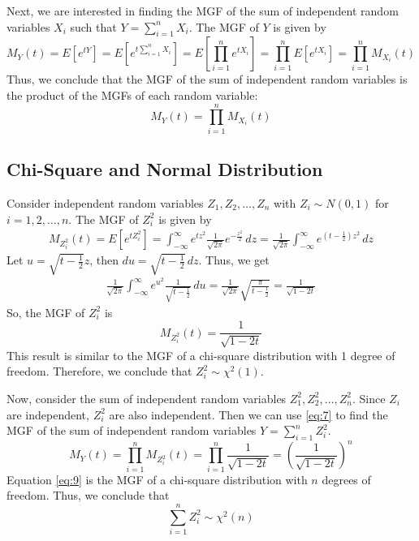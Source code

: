 \documentclass{article}
\begin{document}
Next, we are interested in finding the MGF of the sum of independent random variables \(X_i\) such that \(\displaystyle Y = \sum_{i=1}^{n} X_i\). The MGF of \(Y\) is given by
\begin{equation*}
    M_Y(t) = E[e^{tY}] = E\left[e^{t \sum_{i=1}^{n} X_i}\right] = E\left[\prod_{i=1}^{n} e^{t X_i}\right] = \prod_{i=1}^{n} E[e^{t X_i}] = \prod_{i=1}^{n} M_{X_i}(t)
\end{equation*}
Thus, we conclude that the MGF of the sum of independent random variables is the product of the MGFs of each random variable:
\begin{equation}
    M_Y(t) = \prod_{i=1}^{n} M_{X_i}(t)\label{eq:7}
\end{equation}

\subsection*{Chi-Square and Normal Distribution}
Consider independent random variables \(Z_1, Z_2, \dots, Z_n\) with \(Z_i \sim N(0,1)\) for \(i = 1, 2, \dots, n\). The MGF of \(Z_i^2\) is given by
\begin{align*}
    M_{Z_i^2}(t) = E[e^{t Z_i^2}] = \int_{-\infty}^{\infty} e^{t z^2} \frac{1}{\sqrt{2\pi}} e^{-\frac{z^2}{2}} \, dz = \frac{1}{\sqrt{2\pi}} \int_{-\infty}^{\infty} e^{(t - \frac{1}{2}) z^2} \, dz
\end{align*}
Let \(u = \sqrt{t - \frac{1}{2}} z\), then \(du = \sqrt{t - \frac{1}{2}} \, dz\). Thus, we get
\begin{align*}
    \frac{1}{\sqrt{2\pi}} \int_{-\infty}^{\infty} e^{u^2} \frac{1}{\sqrt{t - \frac{1}{2}}} \, du = \frac{1}{\sqrt{2\pi}} \sqrt{\frac{\pi}{t - \frac{1}{2}}} = \frac{1}{\sqrt{1 - 2t}}
\end{align*}
So, the MGF of \(Z_i^2\) is
\begin{equation}
    M_{Z_i^2}(t) = \frac{1}{\sqrt{1 - 2t}}\label{eq:8}
\end{equation}
This result is similar to the MGF of a chi-square distribution with 1 degree of freedom. Therefore, we conclude that \(Z_i^2 \sim \chi^2(1)\).

Now, consider the sum of independent random variables \(Z_1^2, Z_2^2, \dots, Z_n^2\). Since \(Z_i\) are independent, \(Z_i^2\) are also independent. Then we can use \eqref{eq:7} to find the MGF of the sum of independent random variables \(\displaystyle Y = \sum_{i=1}^{n} Z_i^2\).
\begin{equation}
    M_Y(t) = \prod_{i=1}^{n} M_{Z_i^2}(t) = \prod_{i=1}^{n} \frac{1}{\sqrt{1 - 2t}} = \left(\frac{1}{\sqrt{1 - 2t}}\right)^{n}\label{eq:9}
\end{equation}
Equation \eqref{eq:9} is the MGF of a chi-square distribution with \(n\) degrees of freedom. Thus, we conclude that
\begin{equation}
    \sum_{i=1}^{n} Z_i^2 \sim \chi^2(n)\label{eq:10}
\end{equation}
\end{document}
